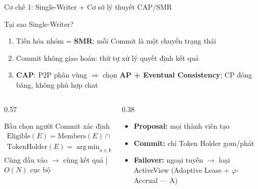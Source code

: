 \documentclass[t, aspectratio=169]{beamer}
\DeclareMathOperator*{\argmin}{arg\,min}
\begin{document}
\begin{frame}[c]{Cơ chế 1: Single-Writer + Cơ sở lý thuyết CAP/SMR}
	\begin{alertblock}{Tại sao Single-Writer?}
		\footnotesize
		\begin{enumerate}
		\setlength{\itemsep}{0pt}
			\item Tiến hóa nhóm = \textbf{SMR}: mỗi Commit là một chuyển trạng thái
			\item Commit \alert{không giao hoán}: thứ tự xử lý quyết định kết quả
			\item \textbf{CAP}: P2P phân vùng $\Rightarrow$ chọn \textbf{AP + Eventual Consistency}; CP đóng băng, không phù hợp chat
		\end{enumerate}
	\end{alertblock}
	\vspace{0.05em}
	\begin{columns}[c]
		\begin{column}{0.57\textwidth}
			\begin{block}{Bầu chọn người Commit xác định}
				\scriptsize
				\begin{gather*}
				\text{Eligible}(E) = \text{Members}(E) \cap \text{ActiveView}(E) \setminus \text{Susp}(E) \\[0.4em]
				\text{TokenHolder}(E) = \argmin_{n \in \text{Eligible}(E)} H(\text{group\_id} \Vert E \Vert n)
				\end{gather*}
			\vspace{0.3em}
			\centering\scriptsize Cùng đầu vào $\to$ cùng kết quả \;|\; $O(N)$ cục bộ
			\end{block}
		\end{column}
		\begin{column}{0.38\textwidth}
		\scriptsize
		\begin{itemize}
		\setlength{\itemsep}{0pt}
			\item \textbf{Proposal:} mọi thành viên tạo
			\item \textbf{Commit:} chỉ Token Holder gom/phát
			\item \textbf{Failover:} ngoại tuyến $\to$ loại ActiveView (Adaptive Lease + $\varphi$-Accrual --- A)
		\end{itemize}
		\end{column}
	\end{columns}
\end{frame}
\end{document}

